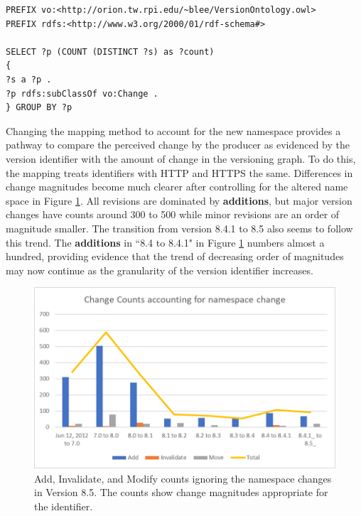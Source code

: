 \begin{lstlisting}[language=SPARQL, caption=This query compiles the counts for each subclass of Change in a GCMD versioning graph,label=gcmd_list]
PREFIX vo:<http://orion.tw.rpi.edu/~blee/VersionOntology.owl>
PREFIX rdfs:<http://www.w3.org/2000/01/rdf-schema#>

SELECT ?p (COUNT (DISTINCT ?s) as ?count)
{
?s a ?p .
?p rdfs:subClassOf vo:Change .
} GROUP BY ?p
\end{lstlisting}

Changing the mapping method to account for the new namespace provides a pathway to compare the perceived change by the producer as evidenced by the version identifier with the amount of change in the versioning graph.
To do this, the mapping treats identifiers with HTTP and HTTPS the same. 
Differences in change magnitudes become much clearer after controlling for the altered name space in Figure \ref{GCMDC2}.
All revisions are dominated by \textbf{additions}, but major version changes have counts around 300 to 500 while minor revisions are an order of magnitude smaller.
The transition from version 8.4.1 to 8.5 also seems to follow this trend.
The \textbf{additions} in ``8.4 to 8.4.1" in Figure \ref{GCMDC2} numbers almost a hundred, providing evidence that the trend of decreasing order of magnitudes may now continue as the granularity of the version identifier increases.

\begin{figure}%
	\centering
	\includegraphics[scale=1]{figures/GCMDChart2.png}
	\caption{Add, Invalidate, and Modify counts ignoring the namespace changes in Version 8.5.  The counts show change magnitudes appropriate for the identifier.}
	\label{GCMDC2}
\end{figure}

